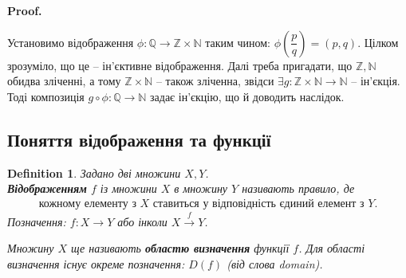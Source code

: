 \documentclass[a4paper, 14pt]{extarticle}
\makeatletter
\theoremstyle{theoremdd}
\theoremstyle{theoremdd}
\newtheorem{definition}[theorem]{Definition}
\theoremstyle{theoremdd}
\theoremstyle{theoremdd}
\theoremstyle{theoremdd}
\theoremstyle{theoremdd}
\theoremstyle{theoremdd}
\theoremstyle{theoremdd}
\theoremstyle{theoremdd}
\theoremstyle{theoremdd}
\theoremstyle{theoremdd}
\theoremstyle{theoremdd}
\theoremstyle{theoremdd}
\theoremstyle{theoremdd}
\theoremstyle{theoremdd}
\renewenvironment{proof}[1][Proof.\\]{\par
\pushQED{\hfill \qed}%
\normalfont \topsep6\p@\@plus6\p@\relax
\trivlist
\item\relax
{\bfseries
#1\@addpunct{.}}\hspace\labelsep\ignorespaces
}{%
\popQED\endtrivlist\@endpefalse
}
\makeatother
\begin{document}
\begin{proof}
Установимо відображення $\phi \colon \mathbb{Q} \to \mathbb{Z} \times \mathbb{N}$ таким чином: $\phi\left( \dfrac{p}{q} \right) = (p,q)$. Цілком зрозуміло, що це -- ін'єктивне відображення. Далі треба пригадати, що $\mathbb{Z}, \mathbb{N}$ обидва зліченні, а тому $\mathbb{Z} \times \mathbb{N}$ -- також зліченна, звідси $\exists g \colon \mathbb{Z} \times \mathbb{N} \to \mathbb{N}$ -- ін'єкція. Тоді композиція $g \circ \phi \colon \mathbb{Q} \to \mathbb{N}$ задає ін'єкцію, що й доводить наслідок. 
\end{proof}

\subsection{Поняття відображення та функції}
	\begin{definition}
	Задано дві множини $X,Y$.\\
	\textbf{Відображенням} $f$ із множини $X$ в множину $Y$ називають правило, де
	\begin{align*}
	\text{кожному елементу з $X$ ставиться у відповідність єдиний елемент з $Y$.}
	\end{align*}
	Позначення: $f \colon X \to Y$ або інколи $X \xrightarrow{f} Y$.
	\begin{figure}[H]
\end{figure}
	Множину $X$ ще називають \textbf{областю визначення} функції $f$. Для області визначення існує окреме позначення: $D(f)$ (від слова domain).
	\end{definition}
	
\end{document}
